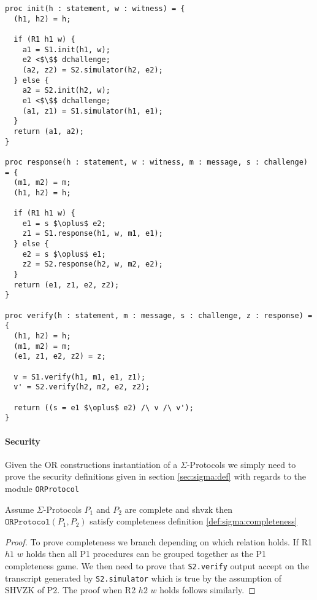 \begin{lstlisting}[float, mathescape, label=lst:sigma:or,caption=OR construction]
proc init(h : statement, w : witness) = {
  (h1, h2) = h;

  if (R1 h1 w) {
    a1 = S1.init(h1, w);
    e2 <$\$$ dchallenge;
    (a2, z2) = S2.simulator(h2, e2);
  } else {
    a2 = S2.init(h2, w);
    e1 <$\$$ dchallenge;
    (a1, z1) = S1.simulator(h1, e1);
  }
  return (a1, a2);
}

proc response(h : statement, w : witness, m : message, s : challenge) = {
  (m1, m2) = m;
  (h1, h2) = h;

  if (R1 h1 w) {
    e1 = s $\oplus$ e2;
    z1 = S1.response(h1, w, m1, e1);
  } else {
    e2 = s $\oplus$ e1;
    z2 = S2.response(h2, w, m2, e2);
  }
  return (e1, z1, e2, z2);
}

proc verify(h : statement, m : message, s : challenge, z : response) = {
  (h1, h2) = h;
  (m1, m2) = m;
  (e1, z1, e2, z2) = z;

  v = S1.verify(h1, m1, e1, z1);
  v' = S2.verify(h2, m2, e2, z2);

  return ((s = e1 $\oplus$ e2) /\ v /\ v');
}
\end{lstlisting}


\paragraph{Security}
Given the OR constructions instantiation of a $\Sigma$-Protocols we simply need
to prove the security definitions given in section \ref{sec:sigma:def} with
regards to the module \texttt{ORProtocol}

\begin{lemma}[OR Completeness]
  Assume $\Sigma$-Protocols $P_{1}$ and $P_{2}$ are complete and shvzk then
  $\texttt{ORProtocol}(P_1, P_2)$ satisfy completeness definition \ref{def:sigma:completeness}
\end{lemma}
\begin{proof}
  To prove completeness we branch depending on which relation holds. If R1 $h1$
  $w$ holds then all P1 procedures can be grouped together as the P1
  completeness game. We then need to prove that \texttt{S2.verify} output accept
  on the transcript generated by \texttt{S2.simulator} which is true by the
  assumption of SHVZK of P2.
  The proof when R2 $h2$ $w$ holds follows similarly.
\end{proof}


